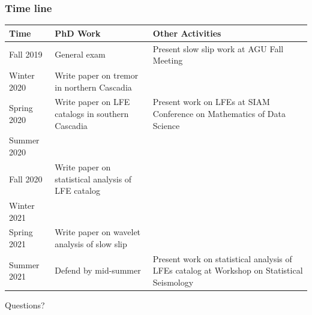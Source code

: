 \documentclass{beamer}
\begin{document}
	\begin{frame}
		\frametitle{Time line}
		\begin{center}
		\tiny{
		\begin{tabular}{| p{1.5cm} p{5cm} p{3cm} |}
			\hline
			\textbf{Time} & \textbf{PhD Work} & \textbf{Other Activities} \\
			\hline
			Fall 2019 & General exam & Present slow slip work at AGU Fall Meeting \\
			\hline
			Winter 2020 & Write paper on tremor in northern Cascadia & \\
			\hline
			Spring 2020 & Write paper on LFE catalogs in southern Cascadia & Present work on LFEs at SIAM Conference on Mathematics of Data Science\\
			\hline
			Summer 2020 & & \\
			\hline
			Fall 2020 & Write paper on statistical analysis of LFE catalog & \\
			\hline
			Winter 2021 & & \\
			\hline
			Spring 2021 & Write paper on wavelet analysis of slow slip & \\
			\hline
			Summer 2021 & Defend by mid-summer & Present work on statistical analysis of LFEs catalog at Workshop on Statistical Seismology \\
			\hline
		\end{tabular}
		}
		\end{center}
	\end{frame}

	\begin{frame}
		\begin{Huge}
			\begin{center}
				Questions?
			\end{center}
		\end{Huge}
	\end{frame}
			
\end{document}
